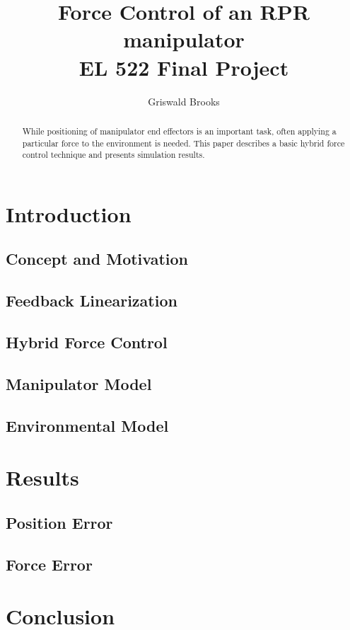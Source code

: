 \documentclass[letterpaper,12pt]{report}
\begin{document}
\title{ Force Control of an RPR manipulator\\EL 522 Final Project}
\author{Griswald Brooks}
\maketitle
 
\begin{abstract}
While positioning of manipulator end effectors is an important task, often applying a particular force to the environment is needed.
This paper describes a basic hybrid force control technique and presents simulation results.
\end{abstract}

\tableofcontents

\chapter{Introduction}
\section{Concept and Motivation}
\section{Feedback Linearization}
\section{Hybrid Force Control}
\section{Manipulator Model}
\section{Environmental Model}

\chapter{Results}
\section{Position Error}
\section{Force Error}


\chapter{Conclusion}
\end{document}
